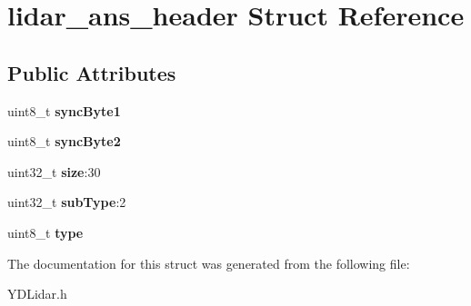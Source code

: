 \hypertarget{structlidar__ans__header}{}\section{lidar\+\_\+ans\+\_\+header Struct Reference}
\label{structlidar__ans__header}
\subsection*{Public Attributes}
\begin{DoxyCompactItemize}
\item 
uint8\+\_\+t {\bfseries sync\+Byte1}\hypertarget{structlidar__ans__header_aeaa5beb7182c922d6d68697ecf60318a}{}\label{structlidar__ans__header_aeaa5beb7182c922d6d68697ecf60318a}

\item 
uint8\+\_\+t {\bfseries sync\+Byte2}\hypertarget{structlidar__ans__header_a9ce80818478513e1cb36de5a17917958}{}\label{structlidar__ans__header_a9ce80818478513e1cb36de5a17917958}

\item 
uint32\+\_\+t {\bfseries size}\+:30\hypertarget{structlidar__ans__header_a6e01bc2ec02153e40f3402790b917af3}{}\label{structlidar__ans__header_a6e01bc2ec02153e40f3402790b917af3}

\item 
uint32\+\_\+t {\bfseries sub\+Type}\+:2\hypertarget{structlidar__ans__header_abd31cd42537cebe7958b95d3f4a07169}{}\label{structlidar__ans__header_abd31cd42537cebe7958b95d3f4a07169}

\item 
uint8\+\_\+t {\bfseries type}\hypertarget{structlidar__ans__header_aab38102a1a266b5bfb842b10bf2804b2}{}\label{structlidar__ans__header_aab38102a1a266b5bfb842b10bf2804b2}

\end{DoxyCompactItemize}


The documentation for this struct was generated from the following file\+:\begin{DoxyCompactItemize}
\item 
Y\+D\+Lidar.\+h\end{DoxyCompactItemize}
